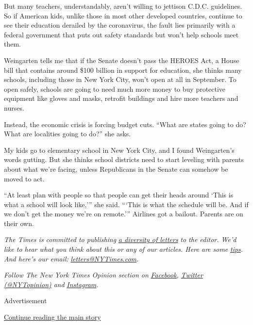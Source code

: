 But many teachers, understandably, aren't willing to jettison C.D.C.
guidelines. So if American kids, unlike those in most other developed
countries, continue to see their education derailed by the coronavirus,
the fault lies primarily with a federal government that puts out safety
standards but won't help schools meet them.

Weingarten tells me that if the Senate doesn't pass the HEROES Act, a
House bill that contains around \$100 billion in support for education,
she thinks many schools, including those in New York City, won't open at
all in September. To open safely, schools are going to need much more
money to buy protective equipment like gloves and masks, retrofit
buildings and hire more teachers and nurses.

Instead, the economic crisis is forcing budget cuts. ``What are states
going to do? What are localities going to do?'' she asks.

My kids go to elementary school in New York City, and I found
Weingarten's words gutting. But she thinks school districts need to
start leveling with parents about what we're facing, unless Republicans
in the Senate can somehow be moved to act.

``At least plan with people so that people can get their heads around
`This is what a school will look like,''' she said. ```This is what the
schedule will be. And if we don't get the money we're on remote.'''
Airlines got a bailout. Parents are on their own.

\emph{The Times is committed to publishing}
\href{https://www.nytimes3xbfgragh.onion/2019/01/31/opinion/letters/letters-to-editor-new-york-times-women.html}{\emph{a
diversity of letters}} \emph{to the editor. We'd like to hear what you
think about this or any of our articles. Here are some}
\href{https://help.nytimes3xbfgragh.onion/hc/en-us/articles/115014925288-How-to-submit-a-letter-to-the-editor}{\emph{tips}}\emph{.
And here's our email:}
\href{mailto:letters@NYTimes.com}{\emph{letters@NYTimes.com}}\emph{.}

\emph{Follow The New York Times Opinion section on}
\href{https://www.facebookcorewwwi.onion/nytopinion}{\emph{Facebook}}\emph{,}
\href{http://twitter.com/NYTOpinion}{\emph{Twitter (@NYTopinion)}}
\emph{and}
\href{https://www.instagram.com/nytopinion/}{\emph{Instagram}}\emph{.}

Advertisement

\protect\hyperlink{after-bottom}{Continue reading the main story}

